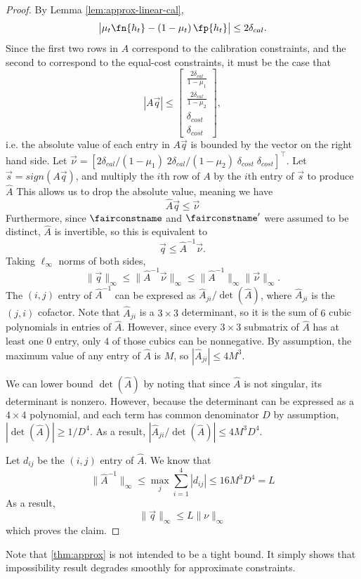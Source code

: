 \newcommand{\wA}{\widehat{A}}
\begin{proof}
  By Lemma \ref{lem:approx-linear-cal},
  \[
    \bigl|\mu_t \fn{h_t} - \left(1 - \mu_t \right) \fp{h_t} \bigr| \le 2
      \delta_{cal}.
  \]
  Since the first two rows in $A$ correspond to the calibration constraints, and
  the second to correspond to the equal-cost constraints, it must be the case
  that
  \[
    |A \vec{q}| \le \begin{bmatrix}
      \frac{2\delta_{cal}}{1-\mu_1} \\ \frac{2 \delta_{cal}}{1-\mu_2} \\
      \delta_{cost} \\ \delta_{cost}
    \end{bmatrix},
  \]
  i.e. the absolute value of each entry in $A\vec{q}$ is bounded by the vector
  on the right hand side. Let $\vec{\nu} = [ 2\delta_{cal}/(1-\mu_1) \; 2
  \delta_{cal}/(1-\mu_2) \; \delta_{cost} \; \delta_{cost}]^\top$.
  Let $\vec{s} = sign(A \vec{q})$, and multiply the
  $i$th row of $A$ by the $i$th entry of $\vec{s}$ to produce $\wA$
  This allows us to drop the absolute value, meaning we have
  \[
    \wA \vec{q} \le \vec{\nu}
  \]
  Furthermore, since $\fairconstname$ and $\fairconstname'$ were assumed to be
  distinct, $\wA$ is invertible, so this is equivalent to
  \[
    \vec{q} \le \wA^{-1}\vec{\nu}.
  \]
  Taking $\ell_{\infty}$ norms of both sides,
  \[
    \|\vec{q}\|_\infty \le \|\wA^{-1} \vec{\nu}\|_\infty \le \|
    \wA^{-1}\|_\infty \|\vec{\nu}\|_\infty.
  \]
  The $(i,j)$ entry of $\wA^{-1}$ can be expresed as $\wA_{ji}/\det(\wA)$,
  where $\wA_{ji}$ is the $(j,i)$ cofactor. Note that $\wA_{ji}$ is a $3 \times 3$
  determinant, so it is the sum of $6$ cubic polynomials in entries of $\wA$.
  However, since every $3 \times 3$ submatrix of $\wA$ has at least one $0$
  entry, only $4$ of those cubics can be nonnegative. By assumption, the maximum
  value of any entry of $\wA$ is $M$, so $|\wA_{ji}| \le 4 M^3$.

  We can lower bound $\det(\wA)$ by noting that since $\wA$ is not singular, its
  determinant is nonzero. However, because the determinant can be expressed as a
  $4 \times 4$ polynomial, and each term has common denominator $D$ by
  assumption, $|\det(\wA)| \ge 1/D^4$. As a result, $|\wA_{ji}/\det(\wA)| \le 4
  M^3 D^4$.

  Let $d_{ij}$ be the $(i,j)$ entry of $\wA$. We know that
  \[
    \|\wA^{-1}\|_\infty \le \max_j \sum_{i=1}^4 |d_{ij}| \le 16M^3 D^4 = L
  \]
  As a result,
  \[
    \|\vec{q}\|_\infty \le L \|\nu\|_\infty
  \]
  which proves the claim.
\end{proof}
%
Note that \autoref{thm:approx} is not intended to be a tight bound. It simply
shows that impossibility result degrades smoothly for approximate constraints.

